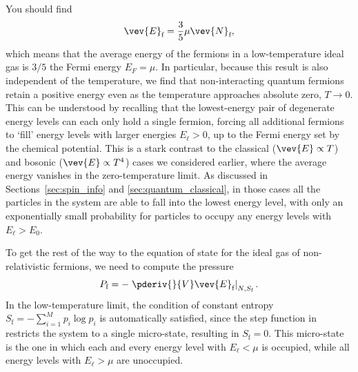 You should find
\begin{equation}
  \label{eq:fermi_E_N}
  \vev{E}_{\text{f}} = \frac{3}{5} \mu \vev{N}_{\text{f}},
\end{equation}
which means that the average energy of the fermions in a low-temperature ideal gas is $3 / 5$ the Fermi energy $E_F = \mu$.
In particular, because this result is also independent of the temperature, we find that non-interacting quantum fermions retain a positive energy even as the temperature approaches absolute zero, $T \to 0$.
This can be understood by recalling that the lowest-energy pair of degenerate energy levels can each only hold a single fermion, forcing all additional fermions to `fill' energy levels with larger energies $E_{\ell} > 0$, up to the Fermi energy set by the chemical potential.
This is a stark contrast to the classical ($\vev{E} \propto T$) and bosonic ($\vev{E} \propto T^4$) cases we considered earlier, where the average energy vanishes in the zero-temperature limit.
As discussed in Sections~\ref{sec:spin_info} and \ref{sec:quantum_classical}, in those cases all the particles in the system are able to fall into the lowest energy level, with only an exponentially small probability for particles to occupy any energy levels with $E_{\ell} > E_0$.

To get the rest of the way to the equation of state for the ideal gas of non-relativistic fermions, we need to compute the pressure
\begin{equation*}
  P_{\text{f}} = -\left. \pderiv{}{V} \vev{E}_{\text{f}} \right|_{N, S_{\text{f}}}.
\end{equation*}
In the low-temperature limit, the condition of constant entropy $S_{\text{f}} = -\sum_{i = 1}^M p_i \log p_i$ is automatically satisfied, since the step function in  restricts the system to a single micro-state, resulting in $S_{\text{f}} = 0$.
This micro-state is the one in which each and every energy level with $E_{\ell} < \mu$ is occupied, while all energy levels with $E_{\ell} > \mu$ are unoccupied.

